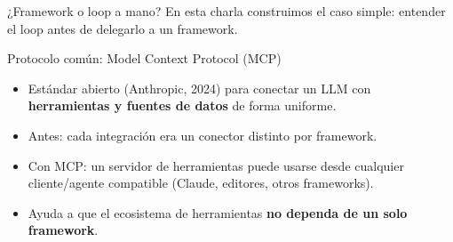 \begin{frame}{¿Framework o loop a mano?}
  \centering
  \vfill
  \footnotesize En esta charla construimos el caso simple: entender el loop
  antes de delegarlo a un framework.
\end{frame}

\begin{frame}{Protocolo común: Model Context Protocol (MCP)}
  \begin{itemize}
    \item Estándar abierto (Anthropic, 2024) para conectar un LLM con
      \textbf{herramientas y fuentes de datos} de forma uniforme.
    \item Antes: cada integración era un conector distinto por framework.
    \item Con MCP: un servidor de herramientas puede usarse desde cualquier
      cliente/agente compatible (Claude, editores, otros frameworks).
    \item Ayuda a que el ecosistema de herramientas \textbf{no dependa de
      un solo framework}.
  \end{itemize}
\end{frame}
